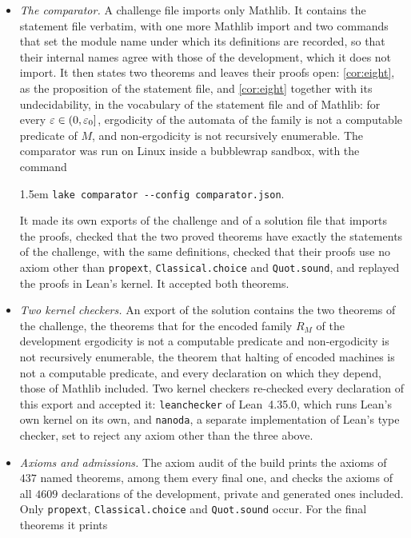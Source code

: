 \begin{itemize}
\item \emph{The comparator.} A challenge file imports only Mathlib. It contains the statement file verbatim, with one more Mathlib import and two commands that set the module name under which its definitions are recorded, so that their internal names agree with those of the development, which it does not import. It then states two theorems and leaves their proofs open: \cref{cor:eight}, as the proposition of the statement file, and \cref{cor:eight} together with its undecidability, in the vocabulary of the statement file and of Mathlib: for every $\varepsilon\in(0,\varepsilon_0]$, ergodicity of the automata of the family is not a computable predicate of $M$, and non-ergodicity is not recursively enumerable. The comparator was run on Linux inside a bubblewrap sandbox, with the command
\begin{flushleft}\small\leftskip1.5em
\texttt{lake comparator -{}-config comparator.json}.
\end{flushleft}
It made its own exports of the challenge and of a solution file that imports the proofs, checked that the two proved theorems have exactly the statements of the challenge, with the same definitions, checked that their proofs use no axiom other than \texttt{propext}, \texttt{Classical.choice} and \texttt{Quot.sound}, and replayed the proofs in Lean's kernel. It accepted both theorems.
\item \emph{Two kernel checkers.} An export of the solution contains the two theorems of the challenge, the theorems that for the encoded family $R_M$ of the development ergodicity is not a computable predicate and non-ergodicity is not recursively enumerable, the theorem that halting of encoded machines is not a computable predicate, and every declaration on which they depend, those of Mathlib included. Two kernel checkers re-checked every declaration of this export and accepted it: \texttt{leanchecker} of Lean~4.35.0, which runs Lean's own kernel on its own, and \texttt{nanoda}, a separate implementation of Lean's type checker, set to reject any axiom other than the three above.
\item \emph{Axioms and admissions.} The axiom audit of the build prints the axioms of $437$ named theorems, among them every final one, and checks the axioms of all $4609$ declarations of the development, private and generated ones included. Only \texttt{propext}, \texttt{Classical.choice} and \texttt{Quot.sound} occur. For the final theorems it prints
\begingroup\scriptsize
\begin{verbatim}

\end{verbatim}
\end{itemize}

